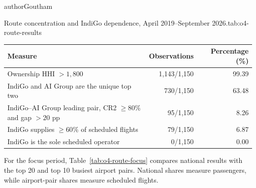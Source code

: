 \begin{mergedcontribution}{authorGoutham}
\begin{resultstable}{Route concentration and IndiGo dependence, April 2019--September 2026.}{tab:o4-route-results}
\centering
\begin{tabularx}{\linewidth}{|>{\raggedright\arraybackslash}X|r|r|}
\hline
\textbf{Measure} & \textbf{Observations} & \textbf{Percentage (\%)} \\
\hline
Ownership HHI $>1{,}800$ & 1,143/1,150 & 99.39 \\
\hline
IndiGo and AI Group are the unique top two & 730/1,150 & 63.48 \\
\hline
IndiGo--AI Group leading pair, CR2 $\geq80\%$ and gap $>20$ pp & 95/1,150 & 8.26 \\
\hline
IndiGo supplies $\geq60\%$ of scheduled flights & 79/1,150 & 6.87 \\
\hline
IndiGo is the sole scheduled operator & 0/1,150 & 0.00 \\
\hline
\end{tabularx}
\par
{}
\end{resultstable}

\medskip
\begin{minipage}{\linewidth}
\setlength{\parskip}{6pt}
For the focus period, Table~\ref{tab:o4-route-focus} compares national results with the top 20 and top 10 busiest airport pairs. National shares measure passengers, while airport-pair shares measure scheduled flights.


\end{minipage}
\end{mergedcontribution}
